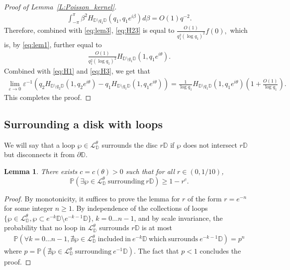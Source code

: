 \documentclass[11pt]{article}
\newtheorem{lemma}[theorem]{Lemma}
\theoremstyle{remark}
\newcommand{\D}{\mathbb{D}}
\newcommand{\Lc}{\mathcal{L}}
\newcommand{\Prob}[1]{\mathbb{P} \left( #1 \right) }
\newcommand{\eps}{\varepsilon}
\numberwithin{equation}{section}
\begin{document}
\begin{proof}[Proof of Lemma~\ref{L:Poisson_kernel}]
\begin{align*}
 \int_{-\pi}^\pi \beta^2  H_{{\mathbb{D}}\setminus q_1 {\mathbb{D}}} (q_1, q_1 e^{i\beta}) d \beta = O(1)q^{-2}.
\end{align*}
Therefore, combined with \eqref{eq:lem3},  \eqref{eq:H23} is equal to
$
 \frac{O(1)}{q_1^2 (\log q_1)^2} f(0),
$
which is, by \eqref{eq:lem1}, further equal to
\begin{align*}
 \frac{O(1)}{q_1^2 (\log q_1)^2}  H_{{\mathbb{D}}\setminus q_1 {\mathbb{D}}} (1, q_1 e^{i\theta}).
\end{align*}
Combined with \eqref{eq:H1} and \eqref{eq:H3}, we get that
\begin{align*}
\lim_{\eps\to 0} \eps^{-1}\left(q_2 H_{{\mathbb{D}}\setminus q_2 {\mathbb{D}}} (1, q_2 e^{i\theta}) - q_1 H_{{\mathbb{D}}\setminus q_1 {\mathbb{D}}} (1, q_1 e^{i\theta})\right) =
\frac{1}{\log q_1} H_{{\mathbb{D}}\setminus q_1 {\mathbb{D}}} (1, q_1 e^{i\theta}) \left(1 + \frac{O(1)}{\log q_1}\right).
\end{align*}
This completes the proof.
\end{proof}


\subsection{Surrounding a disk with loops}

We will say that a loop $\wp \in \Lc_\D^\theta$ surrounds the disc $r \D$ if $\wp$ does not intersect $r \D$ but disconnects it from $\partial \D$.


\begin{lemma}\label{L:surround}
There exists $c = c(\theta)>0$ such that for all $r \in (0,1/10)$,
\begin{equation}
\Prob{ \exists \wp \in \Lc_\D^\theta \mathrm{~surrounding~} r \D } \geq 1 - r^c.
\end{equation}
\end{lemma}

\begin{proof}
By monotonicity, it suffices to prove the lemma for $r$ of the form $r = e^{-n}$ for some integer $n \geq 1$.
By independence of the collections of loops $\{ \wp \in \Lc_\D^\theta, \wp \subset e^{-k} \D \setminus e^{-k-1} \D \}$, $k =0 \dots n-1$, and by scale invariance, the probability that no loop in $\Lc_\D^\theta$ surrounds $r \D$ is at most
\begin{align*}
\Prob{ \forall k=0 \dots n-1, \nexists \wp \in \Lc_\D^\theta \mathrm{~included~in~} e^{-k} \D \mathrm{~which~surrounds~} e^{-k-1} \D  }
= p^n
\end{align*}
where $p = \Prob{ \nexists \wp \in \Lc_\D^\theta \mathrm{~surrounding~} e^{-1} \D  }$. The fact that $p < 1$ concludes the proof.
\end{proof}
\end{document}
